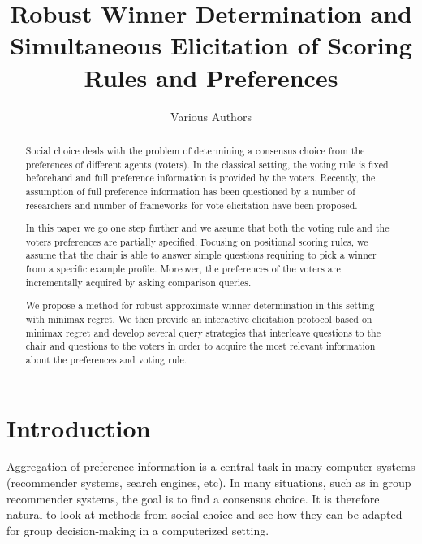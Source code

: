 \documentclass[12pt]{article}
\author{Various Authors}
\title{Robust Winner Determination and Simultaneous Elicitation of Scoring Rules and Preferences}
\begin{document}
\maketitle

\begin{abstract}
Social choice deals with the problem of determining a consensus choice from the preferences of different agents (voters).
In the classical setting, the voting rule is fixed beforehand and full preference information is provided by the voters. 
Recently, the assumption of full preference information has been questioned by a number of researchers and 
number of frameworks for vote elicitation have been proposed.

In this paper we go one step further and we assume that both the voting rule and the voters preferences are partially specified.
Focusing on positional scoring rules, we assume that the chair %
is able to answer simple questions  requiring to pick a winner from a specific  example profile.
Moreover, the preferences of the voters are incrementally acquired by asking comparison queries.

We propose a method  for robust approximate winner determination in this setting with minimax regret. 
We then provide an interactive elicitation protocol based on minimax regret
and develop several query strategies that interleave questions to the chair and questions to the voters in order to acquire the most relevant information about the preferences and voting rule.
\end{abstract}

\section{Introduction}


Aggregation of preference information is a central task in many computer systems (recommender systems, search engines, etc).
In many situations, such as in group recommender systems, the goal is to find a consensus choice.
It is therefore natural to look at methods from social choice and see how they can be adapted for group decision-making in a computerized setting.
\end{document}
